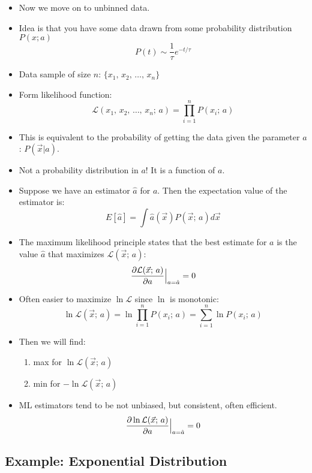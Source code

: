 \begin{itemize}
    \item Now we move on to unbinned data.
    \item Idea is that you have some data drawn from some probability distribution $P(x;a)$
          \[ P(t) \sim \frac{1}{\tau} e^{-t/\tau} \]
    \item Data sample of size $n$: $\{x_1, \, x_2, \, \ldots, \, x_n\}$
    \item Form likelihood function:
          \[ \mathcal{L}(x_1, \, x_2, \, \ldots, \, x_n; \, a) = \prod_{i=1}^n P(x_i; \, a) \]
    \item This is equivalent to the probability of getting the data given the parameter $a$: $P(\vec{x} | a)$.
    \item Not a probability distribution in $a$! It is a function of $a$.
    \item Suppose we have an estimator $\hat{a}$ for $a$. Then the expectation value of the estimator is:
          \[ E[\hat{a}] = \int \hat{a}(\vec{x}) P(\vec{x}; \, a) d\vec{x} \]
    \item The maximum likelihood principle states that the best estimate for $a$ is the value $\hat{a}$ that maximizes $\mathcal{L}(\vec{x}; \, a)$:
          \[ \pdv{\mathcal{L}(\vec{x}; \, a)}{a} \Big|_{a = \hat{a}} = 0 \]
    \item Often easier to maximize $\ln \mathcal{L}$ since $\ln$ is monotonic:
          \[ \ln \mathcal{L}(\vec{x}; \, a) = \ln{ \prod_{i=1}^n P(x_i; \, a)} = \sum_{i=1}^n \ln P(x_i; \, a) \]
    \item Then we will find:
          \begin{enumerate}
              \item max for $\ln \mathcal{L}(\vec{x}; \, a)$
              \item min for $- \ln \mathcal{L}(\vec{x}; \, a)$
          \end{enumerate}
    \item ML estimators tend to be not unbiased, but consistent, often efficient.
          \[ \pdv{\ln \mathcal{L}(\vec{x}; \, a)}{a} \Big|_{a = \hat{a}} = 0 \]
\end{itemize}

\subsection{Example: Exponential Distribution}

